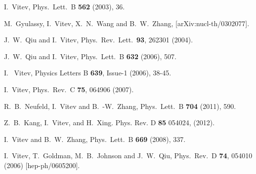 \documentclass[article,showpacs,preprintnumbers,amsmath,amssymb]{revtex4}
\begin{document}
\begin{thebibliography}{80}
 I.~Vitev,
 Phys.\ Lett.\  B {\bf 562} (2003), 36.

 M.~Gyulassy, I.~Vitev, X.~N.~Wang and B.~W.~Zhang,
 [arXiv:nucl-th/0302077].

  J.~W.~Qiu and I.~Vitev,
  Phys.\ Rev.\ Lett.\  {\bf 93}, 262301 (2004).

  J.~W.~Qiu and I.~Vitev,
  Phys.\ Lett.\  B {\bf 632} (2006), 507.

  I.~ Vitev, 
  Physics Letters B {\bf{639}}, Issue-1 (2006), 38-45.

 I.~Vitev,
 Phys.\ Rev.\  C {\bf 75}, 064906 (2007).


  R.~B.~Neufeld, I.~Vitev and B.~-W.~Zhang,
  Phys.\ Lett.\ B {\bf 704} (2011), 590.

  Z.~B.~Kang, I.~Vitev, and H.~Xing. 
  Phys. Rev. D {\bf{85}} 054024, (2012).

 I.~Vitev and B.~W.~Zhang,
 Phys.\ Lett.\  B {\bf 669} (2008), 337.

  I.~Vitev, T.~Goldman, M.~B.~Johnson and J.~W.~Qiu,
  Phys.\ Rev.\ D {\bf 74}, 054010 (2006) [hep-ph/0605200].


\end{thebibliography}
\end{document}

